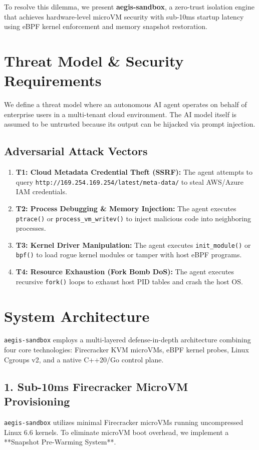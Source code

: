 \documentclass[10pt,twocolumn,a4paper]{article}
\begin{document}
To resolve this dilemma, we present \textbf{aegis-sandbox}, a zero-trust isolation engine that achieves hardware-level microVM security with sub-10ms startup latency using eBPF kernel enforcement and memory snapshot restoration.

\section{Threat Model \& Security Requirements}
We define a threat model where an autonomous AI agent operates on behalf of enterprise users in a multi-tenant cloud environment. The AI model itself is assumed to be untrusted because its output can be hijacked via prompt injection.

\subsection{Adversarial Attack Vectors}
\begin{enumerate}
    \item \textbf{T1: Cloud Metadata Credential Theft (SSRF):} The agent attempts to query \texttt{http://169.254.169.254/latest/meta-data/} to steal AWS/Azure IAM credentials.
    \item \textbf{T2: Process Debugging \& Memory Injection:} The agent executes \texttt{ptrace()} or \texttt{process\_vm\_writev()} to inject malicious code into neighboring processes.
    \item \textbf{T3: Kernel Driver Manipulation:} The agent executes \texttt{init\_module()} or \texttt{bpf()} to load rogue kernel modules or tamper with host eBPF programs.
    \item \textbf{T4: Resource Exhaustion (Fork Bomb DoS):} The agent executes recursive \texttt{fork()} loops to exhaust host PID tables and crash the host OS.
\end{enumerate}

\section{System Architecture}
\texttt{aegis-sandbox} employs a multi-layered defense-in-depth architecture combining four core technologies: Firecracker KVM microVMs, eBPF kernel probes, Linux Cgroups v2, and a native C++20/Go control plane.

\subsection{1. Sub-10ms Firecracker MicroVM Provisioning}
\texttt{aegis-sandbox} utilizes minimal Firecracker microVMs running uncompressed Linux 6.6 kernels. To eliminate microVM boot overhead, we implement a **Snapshot Pre-Warming System**. 
\end{document}

